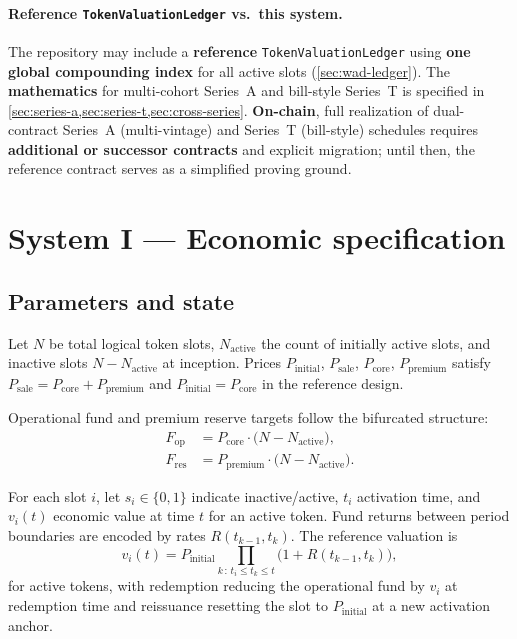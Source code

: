 \documentclass[11pt,a4paper]{article}
\begin{document}
\paragraph{Reference \texttt{TokenValuationLedger} vs.\ this system.}
The repository may include a \textbf{reference} \texttt{TokenValuationLedger} using \textbf{one global compounding index} for all active slots (\cref{sec:wad-ledger}). The \textbf{mathematics} for multi-cohort Series~A and bill-style Series~T is specified in \cref{sec:series-a,sec:series-t,sec:cross-series}. \textbf{On-chain}, full realization of dual-contract Series~A (multi-vintage) and Series~T (bill-style) schedules requires \textbf{additional or successor contracts} and explicit migration; until then, the reference contract serves as a simplified proving ground.

\section{System I --- Economic specification}

\subsection{Parameters and state}

Let $N$ be total logical token slots, $N_{\mathrm{active}}$ the count of initially active slots,
and inactive slots $N - N_{\mathrm{active}}$ at inception. Prices $P_{\mathrm{initial}}$,
$P_{\mathrm{sale}}$, $P_{\mathrm{core}}$, $P_{\mathrm{premium}}$ satisfy
$P_{\mathrm{sale}} = P_{\mathrm{core}} + P_{\mathrm{premium}}$ and
$P_{\mathrm{initial}} = P_{\mathrm{core}}$ in the reference design.

Operational fund and premium reserve targets follow the bifurcated structure:
\begin{align}
F_{\mathrm{op}} &= P_{\mathrm{core}} \cdot \bigl(N - N_{\mathrm{active}}\bigr), \\
F_{\mathrm{res}} &= P_{\mathrm{premium}} \cdot \bigl(N - N_{\mathrm{active}}\bigr).
\end{align}

For each slot $i$, let $s_i \in \{0,1\}$ indicate inactive/active, $t_i$ activation time, and
$v_i(t)$ economic value at time $t$ for an active token. Fund returns between period boundaries are
encoded by rates $R(t_{k-1},t_k)$. The reference valuation is
\begin{equation}
\label{eq:spec-valuation}
v_i(t) = P_{\mathrm{initial}} \prod_{k\,:\,t_i \le t_k \le t} \bigl(1 + R(t_{k-1},t_k)\bigr),
\end{equation}
for active tokens, with redemption reducing the operational fund by $v_i$ at redemption time and
reissuance resetting the slot to $P_{\mathrm{initial}}$ at a new activation anchor.
\end{document}
